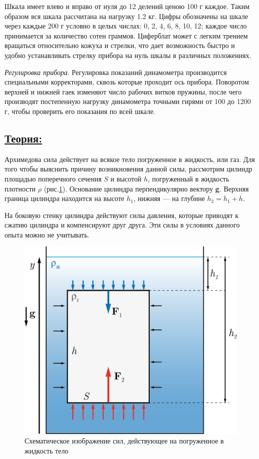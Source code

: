 \documentclass[14pt,a4paper,oneside]{extarticle}	%
\begin{document}
Шкала имеет влево и вправо от нуля до 12 делений ценою 100 г каждое.
Таким образом вся шкала рассчитана на нагрузку 1.2 кг.
Цифры обозначены на шкале через каждые 200 г условно в целых числах: 0, 2, 4, 6, 8, 10, 12; каждое число принимается за количество сотен граммов.
Циферблат может с легким трением вращаться относительно кожуха и стрелки, что дает возможность быстро и удобно устанавливать стрелку прибора на нуль шкалы в различных положениях.

\textit{Регулировка прибора}. Регулировка показаний динамометра производится специальными корректорами, сквозь которые проходит ось прибора.
Поворотом верхней и нижней гаек изменяют число рабочих витков пружины, после чего производят постепенную нагрузку динамометра точными гирями от 100 до 1200 г, чтобы проверить его показания по всей шкале.

\subsection*{\underline{Теория:}}

Архимедова сила действует на всякое тело погруженное в жидкость, или газ.
Для того чтобы выяснить причину возникновения данной силы, рассмотрим цилиндр площадью поперечного сечения $ S $ и высотой $ h $, погруженный в жидкость плотности $\rho$ (рис.\ref{newton-4}). 
Основание цилиндра перпендикулярно вектору \textbf{g}. 
Верхняя граница цилиндра находится на высоте $ h_{1} $, нижняя — на глубине $ h_{2} = h_{1} + h $.

На боковую стенку цилиндра действуют силы давления, которые приводят к сжатию цилиндра и компенсируют друг друга.
Эти силы в условиях данного опыта можно не учитывать.

\begin{figure}[H] 
	\centering 	
	\includegraphics[width=0.6\linewidth]{newton-4.png}
	\caption{Схематическое изображение сил, действующее на погруженное в жидкость тело}
	\label{newton-4}
\end{figure}
\end{document}
